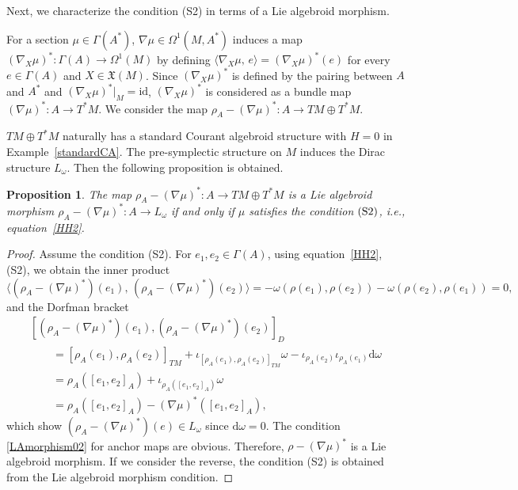 \documentclass[10pt,a4paper]{amsart}
\numberwithin{equation}{section}
\newtheorem{Proposition}[Theorem]{Proposition}
 { \theoremstyle{definition}
\newtheorem{Definition}[Theorem]{Definition}
\newtheorem{Note}[Theorem]{Note}
\newtheorem{Example}[Theorem]{Example}
\newtheorem{Remark}[Theorem]{Remark}
\newtheorem{Question}[Theorem]{Question}
 }
\newcommand{\courant}[2]{{[{{#1},{#2}}]_D}}
\newcommand{\rhoa}{{\rho_A}}
\newcommand{\bracket}[2]{\langle #1,\,#2\rangle}
\newcommand{\rd}{\mathrm{d}}
\begin{document}
Next, we characterize the condition (S2) in terms of a Lie algebroid morphism.

For a section $\mu \in \Gamma(A^*)$, $\nabla \mu \in \Omega^1(M, A^*)$
induces a map $(\nabla_X \mu)^*\colon \Gamma(A) \rightarrow \Omega^1(M)$
by defining $\bracket{\nabla_X \mu}{e} = (\nabla_X \mu)^*(e)$
for every $e \in \Gamma(A)$ and $X \in \mathfrak{X}(M)$.
Since $(\nabla_X \mu)^*$ is defined by the pairing between $A$ and $A^*$
and $(\nabla_X \mu)^*|_M = \mathrm{id}$,
$(\nabla_X \mu)^*$ is considered as a bundle map~${(\nabla \mu)^*\colon A \rightarrow T^*M}$.
We consider the map
$\rhoa - (\nabla \mu)^*\colon A \rightarrow TM \oplus T^*M$.

$TM \oplus T^*M$ naturally has a standard Courant algebroid structure
with $H=0$ in Example~\ref{standardCA}.
The pre-symplectic structure on $M$ induces the Dirac structure $L_{\omega}$.
Then the following proposition is obtained.
\begin{Proposition}\label{SympS2}
The map $\rhoa - (\nabla \mu)^*\colon A \rightarrow TM \oplus T^*M$
is a Lie algebroid morphism ${\rhoa - (\nabla \mu)^*\colon A \rightarrow L_{\omega}}$
if and only if $\mu$
satisfies the condition $\rm (S2)$, i.e., equation~\eqref{HH2}.
\end{Proposition}

\begin{proof}
Assume the condition (S2). For $e_1, e_2 \in \Gamma(A)$,
using equation~\eqref{HH2}, (S2), we obtain the inner product
\[
\bracket{(\rhoa - (\nabla \mu)^*)(e_1)}{(\rhoa - (\nabla \mu)^*)(e_2)}
= - \omega(\rho(e_1), \rho(e_2)) - \omega(\rho(e_2), \rho(e_1)) =0,
\]
and the Dorfman bracket
\begin{gather*}
 \courant{(\rhoa - (\nabla \mu)^*)(e_1)}{(\rhoa - (\nabla \mu)^*)(e_2)}\\
\qquad= [\rhoa(e_1), \rhoa(e_2)]_{TM}
+ \iota_{[\rhoa(e_1), \rhoa(e_2)]_{TM}}\omega
- \iota_{\rhoa(e_2)} \iota_{\rhoa(e_1)} \rd \omega
 \\
\qquad= \rhoa([e_1, e_2]_A)
+ \iota_{\rhoa([e_1, e_2]_A)}\omega
 \\
\qquad= \rhoa([e_1, e_2]_A) - (\nabla \mu)^*([e_1, e_2]_A),
\end{gather*}
which show $(\rhoa - (\nabla \mu)^*)(e) \in L_{\omega}$
since $\rd \omega =0$.
The condition \eqref{LAmorphism02} for anchor maps are obvious.
Therefore, $\rho - (\nabla \mu)^*$ is a Lie algebroid morphism.
If we consider the reverse, the condition (S2) is obtained from the Lie algebroid morphism condition.
\end{proof}
\end{document}
